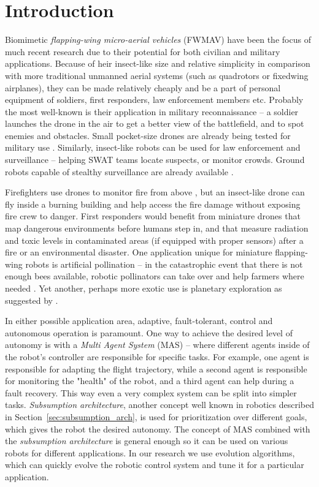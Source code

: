 \chapter{Introduction}
\label{ch:intro}

Biomimetic \textit{flapping-wing micro-aerial vehicles} (FWMAV) have been the focus of much recent research due to their potential for both civilian and military applications. Because of heir insect-like size and relative simplicity in comparison with more traditional unmanned aerial systems (such as quadrotors or fixedwing airplanes), they can be made relatively cheaply and be a part of personal equipment of soldiers, first responders, law enforcement members etc. Probably the most well-known is their application in military reconnaissance -- a soldier launches the drone in the air to get a better view of the battlefield, and to spot enemies and obstacles. Small pocket-size drones are already being tested for military use \cite{proxdynamics}. Similarly, insect-like robots can be used for law enforcement and surveillance -- helping SWAT teams locate suspects, or monitor crowds. Ground robots capable of stealthy surveillance are already available \cite{throwbot}. 

Firefighters use drones to monitor fire from above \cite{firedrone}, but an insect-like drone can fly inside a burning building and help access the fire damage without exposing fire crew to danger. First responders would benefit from miniature drones that map dangerous environments before humans step in, and that measure radiation and toxic levels in contaminated areas (if equipped with proper sensors) after a fire or an environmental disaster. One application unique for miniature flapping-wing robots is artificial pollination -- in the catastrophic event that there is not enough bees available, robotic pollinators can take over and help farmers where needed \cite{robopollination}. Yet another, perhaps more exotic use is planetary exploration as suggested by \cite{Brooks1989}.

In either possible application area, adaptive, fault-tolerant, control and autonomous operation is paramount. One way to achieve the desired level of autonomy is with a \textit{Multi Agent System} (MAS) -- where different agents inside of the robot's controller are responsible for specific tasks. For example, one agent is responsible for adapting the flight trajectory, while a second agent is responsible for monitoring the "health" of the robot, and a third agent can help during a fault recovery. This way even a very complex system can be split into simpler tasks. %
\textit{Subsumption architecture}, another concept well known in robotics described in Section~\ref{sec:subsumption_arch}, is used for prioritization over different goals, which gives the robot the desired autonomy. The concept of MAS combined with the \textit{subsumption architecture} is general enough so it can be used on various robots for different applications. In our research we use evolution algorithms, which can quickly evolve the robotic control system and tune it for a particular application.

